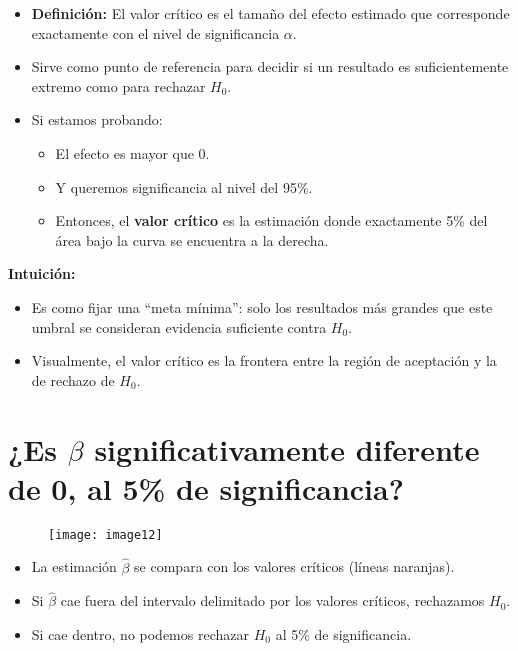 \documentclass[12pt]{article}
\begin{document}
\begin{itemize}
    \item \textbf{Definición:} El valor crítico es el tamaño del efecto estimado que corresponde exactamente con el nivel de significancia $\alpha$.  
    \item Sirve como punto de referencia para decidir si un resultado es suficientemente extremo como para rechazar $H_0$.  
    \item Si estamos probando:  
    \begin{itemize}
        \item El efecto es mayor que 0.  
        \item Y queremos significancia al nivel del 95\%.  
        \item Entonces, el \textbf{valor crítico} es la estimación donde exactamente 5\% del área bajo la curva se encuentra a la derecha.  
    \end{itemize}
\end{itemize}

\textbf{Intuición:}
\begin{itemize}
    \item Es como fijar una “meta mínima”: solo los resultados más grandes que este umbral se consideran evidencia suficiente contra $H_0$.  
    \item Visualmente, el valor crítico es la frontera entre la región de aceptación y la de rechazo de $H_0$.  
\end{itemize}

\section*{\noindent\textbf{¿Es $\beta$ significativamente diferente de 0, al 5\% de significancia?}}

\begin{figure}[H]
    \centering
    \texttt{[image: image12]}
\end{figure}

\begin{itemize}
    \item La estimación $\hat{\beta}$ se compara con los valores críticos (líneas naranjas).  
    \item Si $\hat{\beta}$ cae fuera del intervalo delimitado por los valores críticos, rechazamos $H_0$.  
    \item Si cae dentro, no podemos rechazar $H_0$ al 5\% de significancia.  
\end{itemize}
\end{document}
